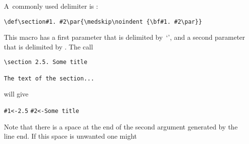 A~commonly used delimiter is :
\begin{verbatim}
\def\section#1. #2\par{\medskip\noindent {\bf#1. #2\par}}
\end{verbatim}
This macro has a first parameter that is delimited by~`',
and a second parameter that is delimited by .
The call
\begin{verbatim}
\section 2.5. Some title

The text of the section...
\end{verbatim}
will give
\begin{disp}\verb>#1<-2.5>\nl
\verb>#2<-Some title>\end{disp}
Note that there is a space at the end of the second argument
generated by the line end. If this space is unwanted one might
